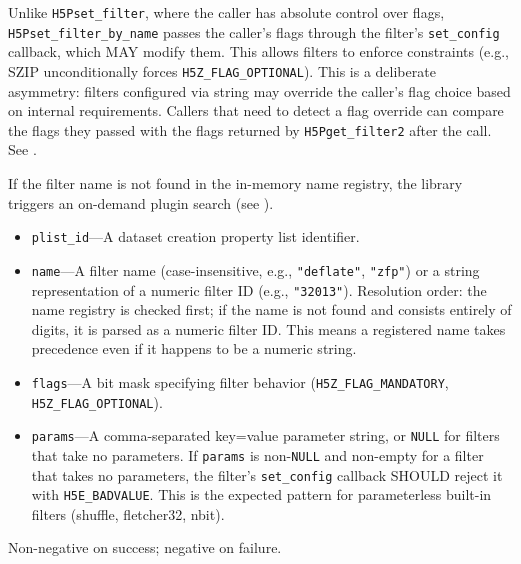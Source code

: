 \documentclass[../HDF5_RFC.tex]{subfiles}
\begin{document}
Unlike \texttt{H5Pset\_filter}, where the caller has
absolute control over flags, \texttt{H5Pset\_filter\_by\_name} passes the caller's
flags through the filter's \texttt{set\_config} callback, which MAY modify them. This
allows filters to enforce constraints (e.g., SZIP unconditionally forces
\texttt{H5Z\_FLAG\_OPTIONAL}). This is a deliberate asymmetry: filters configured via
string may override the caller's flag choice based on internal requirements.
Callers that need to detect a flag override can compare the flags they passed
with the flags returned by \texttt{H5Pget\_filter2} after the call. See
.

If the filter name is not found in the in-memory name registry, the library
triggers an on-demand plugin search (see ).


\begin{itemize}
\item \texttt{plist\_id}---A dataset creation property list identifier.
\item \texttt{name}---A filter name (case-insensitive, e.g., \texttt{"deflate"},
  \texttt{"zfp"}) or a string representation of a numeric filter ID (e.g.,
  \texttt{"32013"}). Resolution order: the name registry is checked first; if the
  name is not found and consists entirely of digits, it is parsed as a numeric
  filter ID. This means a registered name takes precedence even if it happens
  to be a numeric string.
\item \texttt{flags}---A bit mask specifying filter behavior
  (\texttt{H5Z\_FLAG\_MANDATORY}, \texttt{H5Z\_FLAG\_OPTIONAL}).
\item \texttt{params}---A comma-separated key=value parameter string, or \texttt{NULL}
  for filters that take no parameters. If \texttt{params} is non-\texttt{NULL} and
  non-empty for a filter that takes no parameters, the filter's
  \texttt{set\_config} callback SHOULD reject it with \texttt{H5E\_BADVALUE}. This is the
  expected pattern for parameterless built-in filters (shuffle, fletcher32,
  nbit).
\end{itemize}

Non-negative on success; negative on failure.

\end{document}
